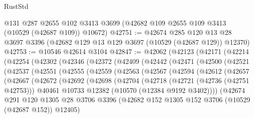 \begin{lexlean}{RustStd}
\begin{coremodule}
    @131
    @287
    @2655
    @102
    @3413
    @3699
    (@42682 @109 @2655 @109 @3413 (@10529 (@42687 @109)) @10672)
@42751 := @42674
    @285
    @120
    @13
    @28
    @3697
    @3396
    (@42682 @129 @13 @129 @3697 (@10529 (@42687 @129)) @12370)
@42753 := @10546 @42614 @3104
@42847 := @42062
    (@42123
      (@42171
        (@42214
          (@42254
            (@42302
              (@42346
                (@42372
                  (@42409
                    (@42442
                      (@42471
                        (@42500
                          (@42521
                            (@42537
                              (@42551
                                (@42555
                                  (@42559
                                    (@42563
                                      (@42567
                                        (@42594
                                          (@42612
                                            (@42657
                                              (@42667
                                                (@42672
                                                  (@42692
                                                    (@42698
                                                      (@42704
                                                        (@42718
                                                          (@42721 (@42736 (@42751 @42753)))
                                                          @40461
                                                          @10733
                                                          @12382
                                                          (@10570 (@12384 @9192 @3402))))
                                                      (@42674
                                                        @291
                                                        @120
                                                        @1305
                                                        @28
                                                        @3706
                                                        @3396
                                                        (@42682
                                                          @152
                                                          @1305
                                                          @152
                                                          @3706
                                                          (@10529 (@42687 @152))
                                                          @12405)

\end{coremodule}
\end{lexlean}
